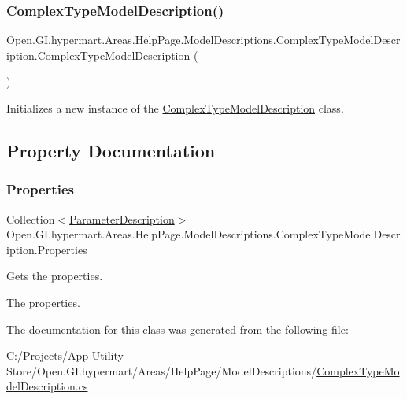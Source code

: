 \subsubsection{\texorpdfstring{Complex\+Type\+Model\+Description()}{ComplexTypeModelDescription()}}
{\footnotesize\ttfamily Open.\+G\+I.\+hypermart.\+Areas.\+Help\+Page.\+Model\+Descriptions.\+Complex\+Type\+Model\+Description.\+Complex\+Type\+Model\+Description (\begin{DoxyParamCaption}{ }\end{DoxyParamCaption})}



Initializes a new instance of the \hyperlink{class_open_1_1_g_i_1_1hypermart_1_1_areas_1_1_help_page_1_1_model_descriptions_1_1_complex_type_model_description}{Complex\+Type\+Model\+Description} class. 



\subsection{Property Documentation}
\hypertarget{class_open_1_1_g_i_1_1hypermart_1_1_areas_1_1_help_page_1_1_model_descriptions_1_1_complex_type_model_description_aef12ede0391a6d743c2f92b1f94d46c2}{}\label{class_open_1_1_g_i_1_1hypermart_1_1_areas_1_1_help_page_1_1_model_descriptions_1_1_complex_type_model_description_aef12ede0391a6d743c2f92b1f94d46c2} 
\subsubsection{\texorpdfstring{Properties}{Properties}}
{\footnotesize\ttfamily Collection$<$\hyperlink{class_open_1_1_g_i_1_1hypermart_1_1_areas_1_1_help_page_1_1_model_descriptions_1_1_parameter_description}{Parameter\+Description}$>$ Open.\+G\+I.\+hypermart.\+Areas.\+Help\+Page.\+Model\+Descriptions.\+Complex\+Type\+Model\+Description.\+Properties\hspace{0.3cm}{\ttfamily [get]}}



Gets the properties. 

The properties. 

The documentation for this class was generated from the following file\+:\begin{DoxyCompactItemize}
\item 
C\+:/\+Projects/\+App-\/\+Utility-\/\+Store/\+Open.\+G\+I.\+hypermart/\+Areas/\+Help\+Page/\+Model\+Descriptions/\hyperlink{_complex_type_model_description_8cs}{Complex\+Type\+Model\+Description.\+cs}\end{DoxyCompactItemize}
